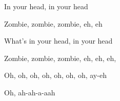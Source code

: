 \begin{song}
\bigskip

In your head, in your head \par
Zombie, zombie, zombie, eh, eh \par
What’s in your head, in your head \par
Zombie, zombie, zombie, eh, eh, eh, \par
{}Oh, oh, oh, oh, oh, oh, oh, ay-eh \par
{}Oh, ah-ah-a-aah \par

\bigskip


\end{song}
